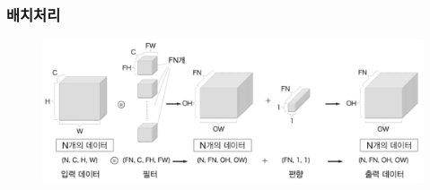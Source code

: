 \documentclass{beamer}
\begin{document}
\begin{frame}
	\frametitle{배치처리}
	\begin{figure}
		\includegraphics[width=1\columnwidth]{../Figure/Figure_9.pdf}
	\end{figure}
\end{frame}


\end{document}
